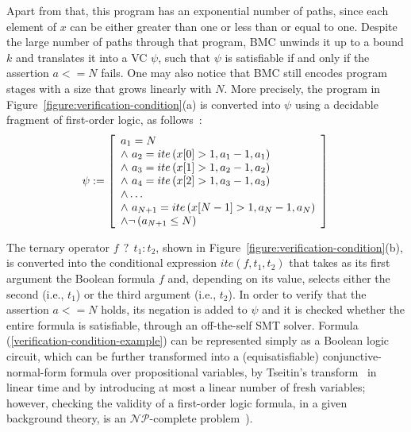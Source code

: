 \documentclass[format=acmsmall, review=false, screen=true]{acmart}
\begin{document}
Apart from that, this program has an exponential number of paths, since each element of $x$ can be either greater than one or less than or equal to one. Despite the large number of paths through that program, BMC unwinds it up to a bound $k$ and translates it into a VC $\psi$, such that $\psi$ is satisfiable if and only if the assertion $a<=N$ fails. One may also notice that BMC still encodes program stages with a size that grows linearly with $N$. More precisely, the program in Figure~\ref{figure:verification-condition}(a) is converted into $\psi$ using a decidable fragment of first-order logic, as follows~\cite{Bradley07}:
%
\begin{equation}              
\label{verification-condition-example}
\psi := \left [ \begin{array}{ll} 
                a_{1} = N  \\
                \wedge \, \, a_{2} = ite\left(x[0] > 1, a_{1} - 1, a_{1}\right) \\ 
                \wedge \, \, a_{3} = ite\left(x[1] > 1, a_{2} - 1, a_{2}\right) \\
                \wedge \, \, a_{4} = ite\left(x[2] > 1, a_{3} - 1, a_{3}\right) \\
                \wedge \ldots \\
                \wedge \, \, a_{N+1} = ite\left(x[N-1] > 1, a_{N} - 1 , a_{N}\right) \\
                \wedge \neg \left(a_{N+1} \leq N\right) \\
              \end{array} \right ]  \\
              \\           
\end{equation}

The ternary operator $f \: \: ? \: \: t_1 : t_2$, shown in Figure~\ref{figure:verification-condition}(b), is converted into the conditional expression $\mathit{ite}(f, t_1, t_2)$ that takes as its first argument the Boolean formula $f$ and, depending on its value, selects either the second (i.e., $t_1$) or the third argument (i.e., $t_2$). In order to verify that the assertion $a<=N$ holds, its negation is added to $\psi$ and it is checked whether the entire formula is satisfiable, through an off-the-self SMT solver. Formula (\ref{verification-condition-example}) can be represented simply as a Boolean logic circuit, which can be further transformed into a (equisatisfiable) conjunctive-normal-form formula over propositional variables, by Tseitin's transform~\cite{Tseitin83} in linear time and by introducing at most a linear number of fresh variables; however, checking the validity of a first-order logic formula, in a given background theory, is an ${\mathcal{NP}}$-complete problem~\cite{PatarinG97}).
\end{document}
